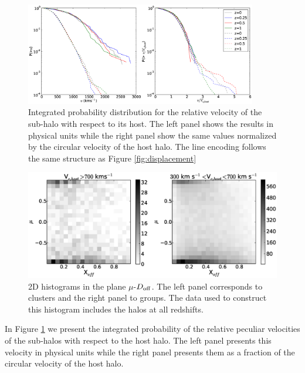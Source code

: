 \documentclass{emulateapj}
\begin{document}
\begin{figure}
\begin{center}
\includegraphics[width=0.9\textwidth]{figure_3.eps}
\end{center}
\caption{Integrated probability distribution for the relative velocity of the
sub-halo with respect to its host. The left panel shows the results
in physical units while the right panel show the same values
normalized by the circular velocity of the host halo. The line encoding
follows the same structure as Figure \ref{fig:displacement}}
\label{fig:velocities}
\end{figure}


\begin{figure}
\begin{center}
\includegraphics[width=1.0\textwidth]{figure_4.eps}
\end{center}
\caption{2D histograms in the plane $\mu$-$D_{\rm off}$. The left
  panel corresponds to clusters and the right panel to groups. The data
  used to construct this histogram includes the halos at all redshifts.}
\label{fig:geometry}
\end{figure}


In Figure \ref{fig:velocities} we present the integrated probability
of the relative peculiar velocities of the sub-halos with respect to
the host halo. The left panel presents this velocity in physical units
while the right panel presents them as a fraction of the circular
velocity of the host halo.  
\end{document}
